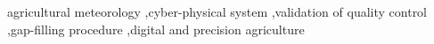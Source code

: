\documentclass[authoryear,preprint,review,12pt]{elsarticle}
\begin{document}
\begin{frontmatter}
\begin{keyword}
agricultural meteorology \sep cyber-physical system \sep validation of quality control \sep gap-filling procedure \sep digital and precision agriculture

\end{keyword}



\end{frontmatter}


\linenumbers

\end{document}
